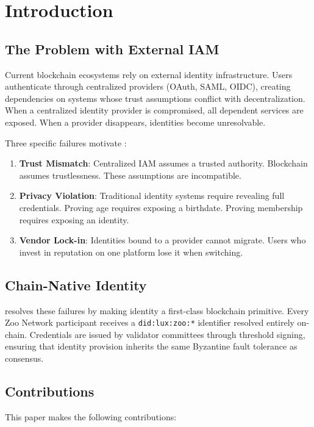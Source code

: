 \section{Introduction}


\subsection{The Problem with External IAM}

Current blockchain ecosystems rely on external identity infrastructure. Users authenticate through centralized providers (OAuth, SAML, OIDC), creating dependencies on systems whose trust assumptions conflict with decentralization. When a centralized identity provider is compromised, all dependent services are exposed. When a provider disappears, identities become unresolvable.

Three specific failures motivate \IChain{}:

\begin{enumerate}
\item \textbf{Trust Mismatch}: Centralized IAM assumes a trusted authority. Blockchain assumes trustlessness. These assumptions are incompatible.
\item \textbf{Privacy Violation}: Traditional identity systems require revealing full credentials. Proving age requires exposing a birthdate. Proving membership requires exposing an identity.
\item \textbf{Vendor Lock-in}: Identities bound to a provider cannot migrate. Users who invest in reputation on one platform lose it when switching.
\end{enumerate}

\subsection{Chain-Native Identity}

\IChain{} resolves these failures by making identity a first-class blockchain primitive. Every Zoo Network participant receives a \texttt{did:lux:zoo:*} identifier resolved entirely on-chain. Credentials are issued by validator committees through threshold signing, ensuring that identity provision inherits the same Byzantine fault tolerance as consensus.

\subsection{Contributions}

This paper makes the following contributions:

